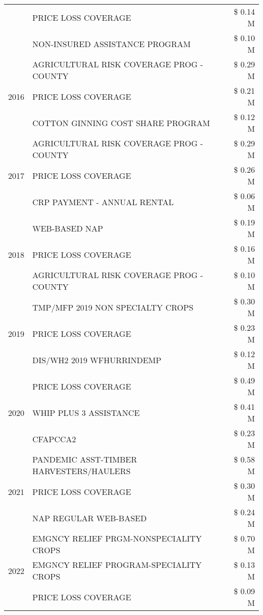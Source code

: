 \begin{tabular}{llr}
 & PRICE LOSS COVERAGE & \$ 0.14 M \\
 & NON-INSURED ASSISTANCE PROGRAM & \$ 0.10 M \\
\cline{1-3}
\multirow[t]{3}{*}{2016} & AGRICULTURAL RISK COVERAGE PROG - COUNTY & \$ 0.29 M \\
 & PRICE LOSS COVERAGE & \$ 0.21 M \\
 & COTTON GINNING COST SHARE PROGRAM & \$ 0.12 M \\
\cline{1-3}
\multirow[t]{3}{*}{2017} & AGRICULTURAL RISK COVERAGE PROG - COUNTY & \$ 0.29 M \\
 & PRICE LOSS COVERAGE & \$ 0.26 M \\
 & CRP PAYMENT - ANNUAL RENTAL & \$ 0.06 M \\
\cline{1-3}
\multirow[t]{3}{*}{2018} & WEB-BASED NAP & \$ 0.19 M \\
 & PRICE LOSS COVERAGE & \$ 0.16 M \\
 & AGRICULTURAL RISK COVERAGE PROG - COUNTY & \$ 0.10 M \\
\cline{1-3}
\multirow[t]{3}{*}{2019} & TMP/MFP 2019 NON SPECIALTY CROPS & \$ 0.30 M \\
 & PRICE LOSS COVERAGE & \$ 0.23 M \\
 & DIS/WH2 2019 WFHURRINDEMP & \$ 0.12 M \\
\cline{1-3}
\multirow[t]{3}{*}{2020} & PRICE LOSS COVERAGE & \$ 0.49 M \\
 & WHIP PLUS 3 ASSISTANCE & \$ 0.41 M \\
 & CFAPCCA2 & \$ 0.23 M \\
\cline{1-3}
\multirow[t]{3}{*}{2021} & PANDEMIC ASST-TIMBER HARVESTERS/HAULERS & \$ 0.58 M \\
 & PRICE LOSS COVERAGE & \$ 0.30 M \\
 & NAP REGULAR WEB-BASED & \$ 0.24 M \\
\cline{1-3}
\multirow[t]{3}{*}{2022} & EMGNCY RELIEF PRGM-NONSPECIALITY CROPS & \$ 0.70 M \\
 & EMGNCY RELIEF PROGRAM-SPECIALITY CROPS & \$ 0.13 M \\
 & PRICE LOSS COVERAGE & \$ 0.09 M \\
\cline{1-3}
\bottomrule
\end{tabular}
